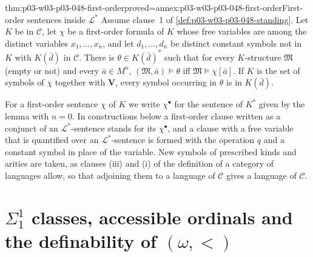 \begin{hblemma}{thm:p03-w03-p03-048-first-order}{proved=annex:p03-w03-p03-048-first-order}{First-order sentences inside \(\mathcal L^{\ast}\)}
Assume clause~1 of \cref{def:p03-w03-p03-048-standing}.  Let \(K\) be in
\(\mathcal C\), let \(\chi\) be a first-order formula of \(K\) whose free
variables are among the distinct variables \(x_1,\ldots,x_n\), and let
\(d_1,\ldots,d_n\) be distinct constant symbols not in \(K\) with
\(K(\bar d)\) in \(\mathcal C\).  There is \(\theta\in K(\bar d)^{\ast}\)
such that for every \(K\)-structure \(\mathfrak M\) (empty or not) and every
\(\bar a\in M^{n}\), \((\mathfrak M,\bar a)\models\theta\) iff
\(\mathfrak M\models\chi[\bar a]\).  If \(K\) is the set of symbols of
\(\chi\) together with \(\mathbf V\), every symbol occurring in \(\theta\) is
in \(K(\bar d)\).
\end{hblemma}

For a first-order sentence \(\chi\) of \(K\) we write \(\chi^{\bullet}\) for
the sentence of \(K^{\ast}\) given by the lemma with \(n=0\).  In
constructions below a first-order clause written as a conjunct of an
\(\mathcal L^{\ast}\)-sentence stands for its \(\chi^{\bullet}\), and a
clause with a free variable that is quantified over an
\(\mathcal L^{\ast}\)-sentence is formed with the operation \(q\) and a
constant symbol in place of the variable.  New symbols of prescribed kinds
and arities are taken, as clauses (iii) and (i) of the definition of a
category of languages allow, so that adjoining them to a language of
\(\mathcal C\) gives a language of \(\mathcal C\).

\section{\texorpdfstring{\(\Sigma^1_1\)}{Sigma-1-1} classes, accessible ordinals and the definability of \texorpdfstring{\((\omega,<)\)}{(omega,<)}}
\label{sec:p03-w03-p03-048-accessible}


